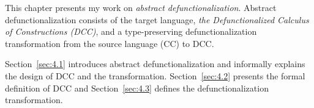 
This chapter presents my work on \textit{abstract defunctionalization}. Abstract defunctionalization consists of the target language, \textit{the Defunctionalized Calculus of Constructions (DCC)}, and a type-preserving defunctionalization transformation from the source language (CC) to DCC. 

Section~\ref{sec:4.1} introduces abstract defunctionalization and informally explains the design of DCC and the transformation. Section~\ref{sec:4.2} presents the formal definition of DCC and Section~\ref{sec:4.3} defines the defunctionalization transformation.




